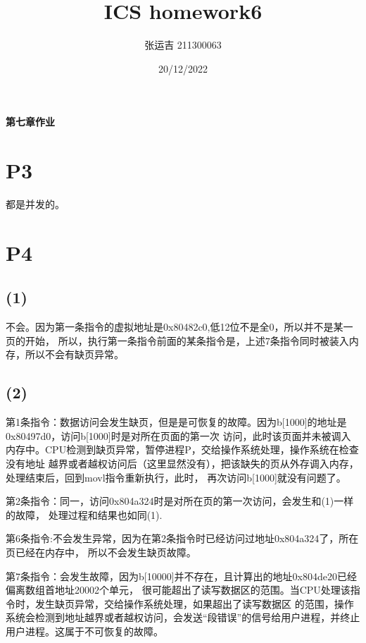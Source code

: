 \documentclass{article}
\title{ICS homework6}
\author{张运吉 211300063}
\date{20/12/2022}
\begin{document}
 
\maketitle %
\begin{center}
    \textbf{第七章作业}
\end{center}
\section*{P3}
都是并发的。
\section*{P4}
\subsection*{(1)}
不会。因为第一条指令的虚拟地址是0x80482c0,低12位不是全0，所以并不是某一页的开始，
所以，执行第一条指令前面的某条指令是，上述7条指令同时被装入内存，所以不会有缺页异常。
\subsection*{(2)}
第1条指令：数据访问会发生缺页，但是是可恢复的故障。因为b[1000]的地址是0x80497d0，访问b[1000]时是对所在页面的第一次
访问，此时该页面并未被调入内存中。CPU检测到缺页异常，暂停进程P，交给操作系统处理，操作系统在检查没有地址
越界或者越权访问后（这里显然没有），把该缺失的页从外存调入内存，处理结束后，回到movl指令重新执行，此时，
再次访问b[1000]就没有问题了。

第2条指令：同一，访问0x804a324时是对所在页的第一次访问，会发生和(1)一样的故障，
处理过程和结果也如同(1).

第6条指令:不会发生异常，因为在第2条指令时已经访问过地址0x804a324了，所在页已经在内存中，
所以不会发生缺页故障。

第7条指令：会发生故障，因为b[10000]并不存在，且计算出的地址0x804de20已经偏离数组首地址20002个单元，
很可能超出了读写数据区的范围。当CPU处理该指令时，发生缺页异常，交给操作系统处理，如果超出了读写数据区
的范围，操作系统会检测到地址越界或者越权访问，会发送“段错误”的信号给用户进程，并终止用户进程。这属于不可恢复的故障。
\end{document}
